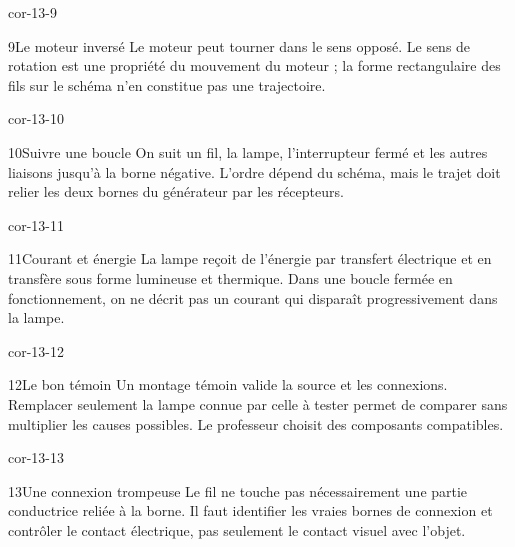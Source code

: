 \documentclass[12pt,twoside,openany]{book}
\begin{document}
\begin{blocLivre}{cor-13-9}
\begin{corrige}{9}{Le moteur inversé}
Le moteur peut tourner dans le sens opposé. Le sens de rotation est une propriété du mouvement du moteur ; la forme rectangulaire des fils sur le schéma n’en constitue pas une trajectoire.\par
\end{corrige}\end{blocLivre}
\begin{blocLivre}{cor-13-10}
\begin{corrige}{10}{Suivre une boucle}
On suit un fil, la lampe, l’interrupteur fermé et les autres liaisons jusqu’à la borne négative. L’ordre dépend du schéma, mais le trajet doit relier les deux bornes du générateur par les récepteurs.\par
{}
\end{corrige}\end{blocLivre}
\begin{blocLivre}{cor-13-11}
\begin{corrige}{11}{Courant et énergie}
La lampe reçoit de l’énergie par transfert électrique et en transfère sous forme lumineuse et thermique. Dans une boucle fermée en fonctionnement, on ne décrit pas un courant qui disparaît progressivement dans la lampe.\par
\end{corrige}\end{blocLivre}
\begin{blocLivre}{cor-13-12}
\begin{corrige}{12}{Le bon témoin}
Un montage témoin valide la source et les connexions. Remplacer seulement la lampe connue par celle à tester permet de comparer sans multiplier les causes possibles. Le professeur choisit des composants compatibles.\par
\end{corrige}\end{blocLivre}
\begin{blocLivre}{cor-13-13}
\begin{corrige}{13}{Une connexion trompeuse}
Le fil ne touche pas nécessairement une partie conductrice reliée à la borne. Il faut identifier les vraies bornes de connexion et contrôler le contact électrique, pas seulement le contact visuel avec l’objet.\par
\end{corrige}\end{blocLivre}
\end{document}
